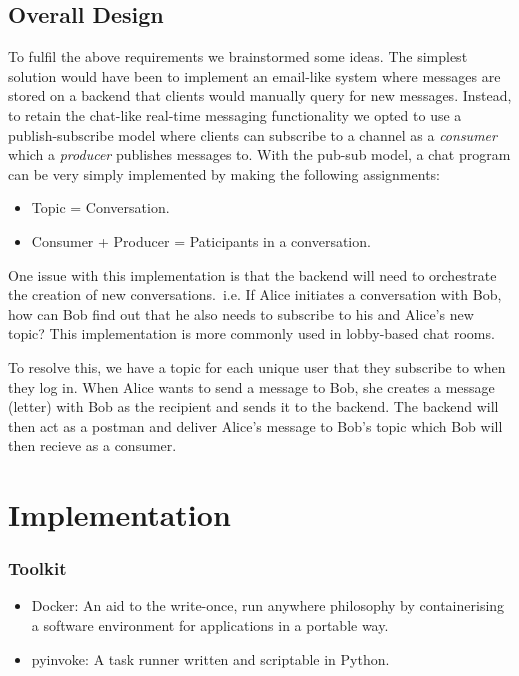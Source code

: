 \documentclass[11pt,a4paper]{report}
\begin{document}
\section{Overall Design}

To fulfil the above requirements we brainstormed some ideas. The simplest solution would have been to implement an email-like system where messages are stored on a backend that clients would manually query for new messages. Instead, to retain the chat-like real-time messaging functionality we opted to use a publish-subscribe model where clients can subscribe to a channel as a \emph{consumer} which a \emph{producer} publishes messages to. With the pub-sub model, a chat program can be very simply implemented by making the following assignments:

\begin{itemize}
  \item Topic = Conversation.
  \item Consumer + Producer = Paticipants in a conversation.
\end{itemize}

One issue with this implementation is that the backend will need to orchestrate the creation of new conversations.\ i.e. If Alice initiates a conversation with Bob, how can Bob find out that he also needs to subscribe to his and Alice's new topic? This implementation is more commonly used in lobby-based chat rooms.

To resolve this, we have a topic for each unique user that they subscribe to when they log in. When Alice wants to send a message to Bob, she creates a message (letter) with Bob as the recipient and sends it to the backend. The backend will then act as a postman and deliver Alice's message to Bob's topic which Bob will then recieve as a consumer.

\chapter{Implementation}

\subsection{Toolkit}

\begin{itemize}
  \item Docker: An aid to the write-once, run anywhere philosophy by containerising a software environment for applications in a portable way.
  \item pyinvoke: A task runner written and scriptable in Python.
\end{itemize}
\end{document}

